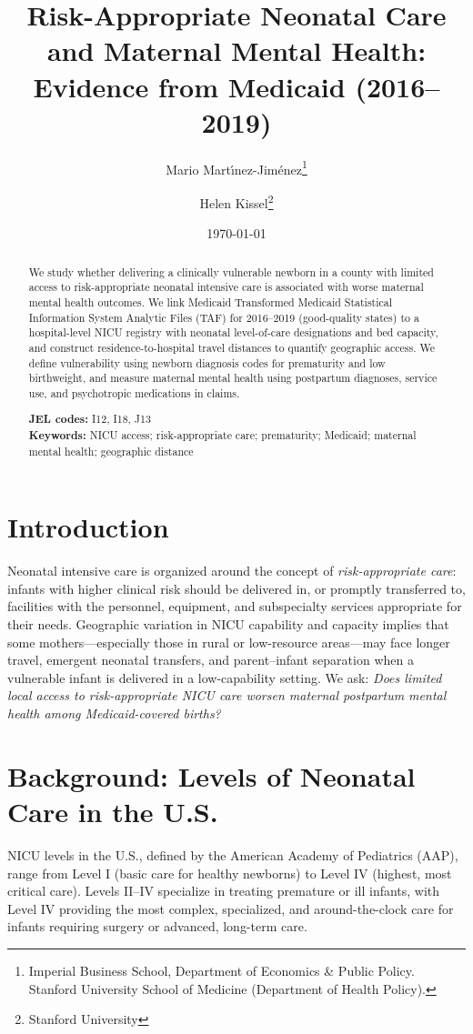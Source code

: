 \documentclass[12pt]{article}
\title{Risk-Appropriate Neonatal Care and Maternal Mental Health:
Evidence from Medicaid  (2016--2019) }
\author{
Mario Mart\'{\i}nez-Jim\'enez\thanks{Imperial Business School, Department of Economics \& Public Policy. Stanford University School of Medicine (Department of Health Policy).}
\and
Helen Kissel\thanks{Stanford University}
}
\date{\today}
\begin{document}
\maketitle

\begin{abstract}
We study whether delivering a clinically vulnerable newborn in a county with limited access to risk-appropriate neonatal intensive care is associated with worse maternal mental health outcomes. We link Medicaid Transformed Medicaid Statistical Information System Analytic Files (TAF) for 2016--2019 (good-quality states) to a hospital-level NICU registry with neonatal level-of-care designations and bed capacity, and construct residence-to-hospital travel distances to quantify geographic access. We define vulnerability using newborn diagnosis codes for prematurity and low birthweight, and measure maternal mental health using postpartum diagnoses, service use, and psychotropic medications in claims.

\vspace{0.5em}
\noindent \textbf{JEL codes:} I12, I18, J13\\
\textbf{Keywords:} NICU access; risk-appropriate care; prematurity; Medicaid; maternal mental health; geographic distance
\end{abstract}

\newpage

\section{Introduction}
Neonatal intensive care is organized around the concept of \emph{risk-appropriate care}: infants with higher clinical risk should be delivered in, or promptly transferred to, facilities with the personnel, equipment, and subspecialty services appropriate for their needs. Geographic variation in NICU capability and capacity implies that some mothers---especially those in rural or low-resource areas---may face longer travel, emergent neonatal transfers, and parent--infant separation when a vulnerable infant is delivered in a low-capability setting. We ask: \emph{Does limited local access to risk-appropriate NICU care worsen maternal postpartum mental health among Medicaid-covered births?}

\section{Background: Levels of Neonatal Care in the U.S.}
NICU levels in the U.S., defined by the American Academy of Pediatrics (AAP), range from Level I (basic care for healthy newborns) to Level IV (highest, most critical care). Levels II--IV specialize in treating premature or ill infants, with Level IV providing the most complex, specialized, and around-the-clock care for infants requiring surgery or advanced, long-term care.
\end{document}
